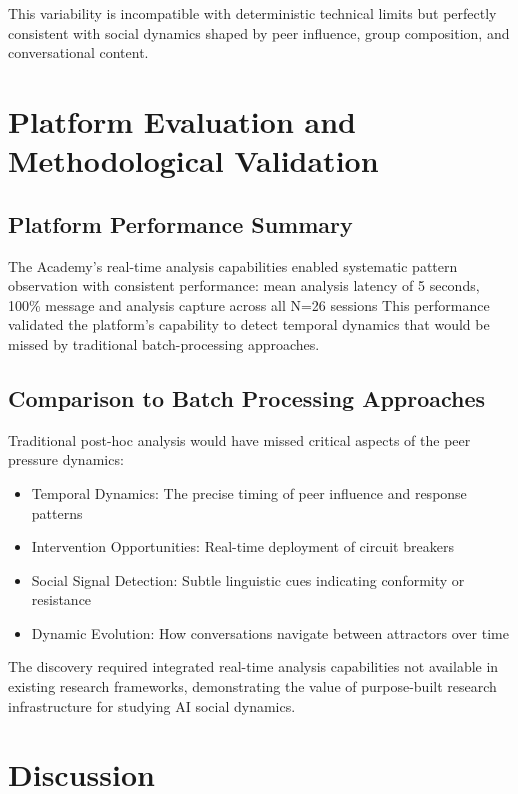 \documentclass[11pt,letterpaper]{article}
\newcommand{\theacademy}{The Academy}
\newcommand{\exponedataTotalSessionsRaw}{26}
\newcommand{\exponedataTotalSessions}{N=\exponedataTotalSessionsRaw}
\newcommand{\platformLatency}{5}
\begin{document}
This variability is incompatible with deterministic technical limits but perfectly consistent with social dynamics shaped by peer influence, group composition, and conversational content.


\section{Platform Evaluation and Methodological Validation}

\subsection{Platform Performance Summary}

\theacademy{}'s real-time analysis capabilities enabled systematic pattern observation with consistent performance: mean analysis latency of \platformLatency{} seconds, 100\% message and analysis capture across all \exponedataTotalSessions{} sessions This performance validated the platform's capability to detect temporal dynamics that would be missed by traditional batch-processing approaches.

\subsection{Comparison to Batch Processing Approaches}

Traditional post-hoc analysis would have missed critical aspects of the peer pressure dynamics:

\begin{itemize}
    \item Temporal Dynamics: The precise timing of peer influence and response patterns
    \item Intervention Opportunities: Real-time deployment of circuit breakers
    \item Social Signal Detection: Subtle linguistic cues indicating conformity or resistance
    \item Dynamic Evolution: How conversations navigate between attractors over time
\end{itemize}

The discovery required integrated real-time analysis capabilities not available in existing research frameworks, demonstrating the value of purpose-built research infrastructure for studying AI social dynamics.

\section{Discussion}
\end{document}
